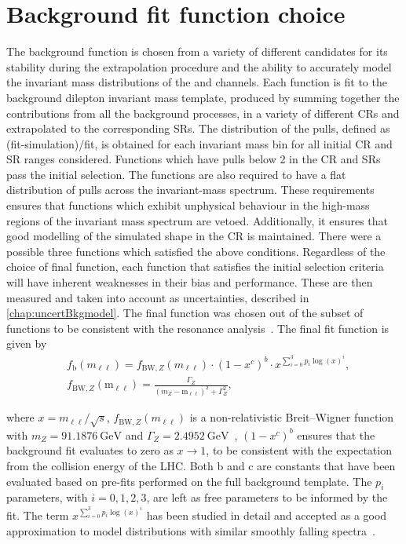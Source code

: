 \section{Background fit function choice}\label{sec:modelchoice}
The background function is chosen from a variety of different candidates for its stability during the extrapolation procedure and the ability to accurately model the invariant mass distributions of the \ee and \mumu channels. Each function is fit to the background dilepton invariant mass template, produced by summing together the contributions from all the background processes, in a variety of different CRs and extrapolated to the corresponding SRs. The distribution of the pulls, defined as (fit-simulation)/fit, is obtained for each invariant mass bin for all initial CR and SR ranges considered. Functions which have pulls below 2 in the CR and SRs pass the initial selection. The functions are also required to have a flat distribution of pulls across the invariant-mass spectrum. These requirements ensures that functions which exhibit unphysical behaviour in the high-mass regions of the invariant mass spectrum are vetoed. Additionally, it ensures that good modelling of the simulated shape in the CR is maintained. There were a possible three functions which satisfied the above conditions. Regardless of the choice of final function, each function that satisfies the initial selection criteria will have inherent weaknesses in their bias and performance. These are then measured and taken into account as uncertainties, described in \cref{chap:uncertBkgmodel}. The final function was chosen out of the subset of functions to be consistent with the resonance analysis~\cite{Aad:2019fac}. The final fit function is given by
\begin{equation}
    \label{eq:fitfunc}
    \begin{aligned}
        & f_\textrm{b}(m_{\ell\ell}) = f_{\mathrm{BW},Z}(m_{\ell\ell}) \cdot \left(1 - x^{c}\right)^{b} \cdot x^{\sum_{i=0}^3 p_i\log(x)^i}, \\
        & f_{\mathrm{BW},Z}(\mathrm{m_{\ell\ell}}) = \frac{\Gamma_Z}{(m_Z - \mathrm{m_{\ell\ell}})^2 + \Gamma_Z^2},
    \end{aligned}
\end{equation}

where $x = m_{\ell\ell}/\sqrt{s}$, $f_{\mathrm{BW},Z}(m_{\ell\ell})$ is a non-relativistic Breit--Wigner function with $m_Z = \SI{91.1876}{\giga\electronvolt}$ and $\Gamma_Z = \SI{2.4952}{\giga\electronvolt}$~\cite{PhysRevD.98.030001}, $(1 - x^{c})^b$ ensures that the background fit evaluates to zero as $x \to 1$, to be consistent with the expectation from the collision energy of the LHC. Both b and c are constants that have been evaluated based on pre-fits performed on the full background template. The $p_i$ parameters, with $i = 0,1,2,3$, are left as free parameters to be informed by the fit. The term $x^{\sum_{i=0}^3 p_i\log(x)^i}$ has been studied in detail and accepted as a good approximation to model distributions with similar smoothly falling spectra~\cite{Aad:2019fac,Aaboud:2016tru,Aaboud:2017yyg}.

